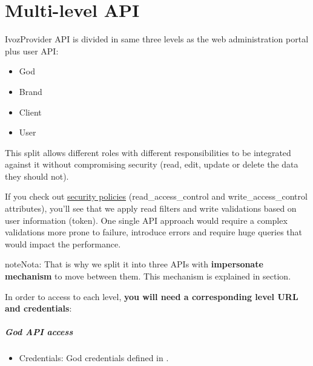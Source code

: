 \documentclass[letterpaper,10pt,spanish]{sphinxmanual}
\begin{document}
\chapter{Multi-level API}
\label{api_rest/multilevel::doc}\label{api_rest/multilevel:multi-level-api}
IvozProvider API is divided in same three levels as the web administration portal plus user API:
\begin{itemize}
\item {} 
God

\item {} 
Brand

\item {} 
Client

\item {} 
User

\end{itemize}

This split allows different roles with different responsibilities to be integrated against it without compromising
security (read, edit, update or delete the data they should not).

If you check out \href{https://github.com/irontec/ivozprovider/blob/bleeding/web/rest/brand/config/api/raw/provider.yml}{security policies}
(read\_access\_control and write\_access\_control attributes), you’ll see that we apply
read filters and write validations based on user information (token). One single API approach would require a complex
validations more prone to failure, introduce errors and require huge queries that would impact the performance.

\begin{notice}{note}{Nota:}
That is why we split it into three APIs with \textbf{impersonate mechanism} to move between them. This mechanism is
explained in {\hyperref[api_rest/use_case:use\string-case]{}} section.
\end{notice}

In order to access to each level, \textbf{you will need a corresponding level URL and credentials}:
\paragraph{God API access}
\begin{itemize}
\item {} 
Credentials: God credentials defined in {\hyperref[administration_portal/platform/main_operators:main\string-operators]{}}.

\end{itemize}
\end{document}
